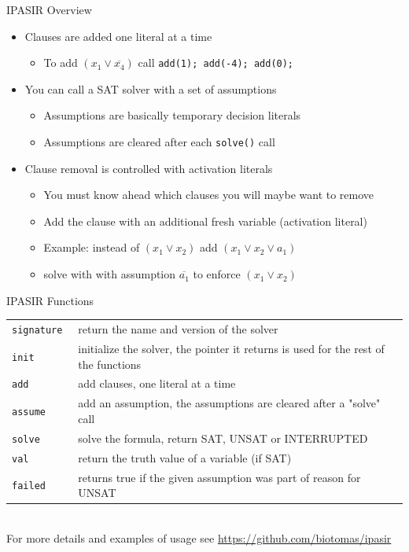 \documentclass[t]{sdqbeamer}
\begin{document}
\begin{frame}{IPASIR Overview}
\begin{itemize}\setlength{\itemsep}{1em}
\item Clauses are added one literal at a time
\begin{itemize}\setlength{\itemsep}{1ex}
	\item To add $(x_1 \vee \overline{x_4})$ call \texttt{add(1); add(-4); add(0);}
\end{itemize}
\item You can call a SAT solver with a set of assumptions
\begin{itemize}\setlength{\itemsep}{1ex}
	\item Assumptions are basically temporary decision literals
	\item Assumptions are cleared after each \texttt{solve()} call
\end{itemize}
\item Clause removal is controlled with activation literals
\begin{itemize}\setlength{\itemsep}{1ex}
	\item You must know ahead which clauses you will maybe want to remove
	\item Add the clause with an additional fresh variable (activation literal)
	\item Example: instead of $(x_1 \vee x_2)$ add $(x_1 \vee x_2 \vee a_1)$
	\item solve with with assumption $\overline{a_1}$ to enforce $(x_1 \vee x_2)$
\end{itemize}
\end{itemize}
\end{frame}

\begin{frame}{IPASIR Functions}
	\def\arraystretch{1.5}
	\begin{tabularx}{\textwidth}{lX}
		\tt signature 	& return the name and version of the solver\\
		\tt init    	& initialize the solver, the pointer it returns is used for the rest of the functions\\
		\tt add 		& add clauses, one literal at a time\\
		\tt assume 		& add an assumption, the assumptions are cleared after a "solve" call\\
		\tt solve 		& solve the formula, return SAT, UNSAT or INTERRUPTED\\
		\tt val 		& return the truth value of a variable (if SAT)\\
		\tt failed 		& returns true if the given assumption was part of reason for UNSAT\\
	\end{tabularx}~\\[1em]
	For more details and examples of usage see \url{https://github.com/biotomas/ipasir}
\end{frame}
\end{document}
